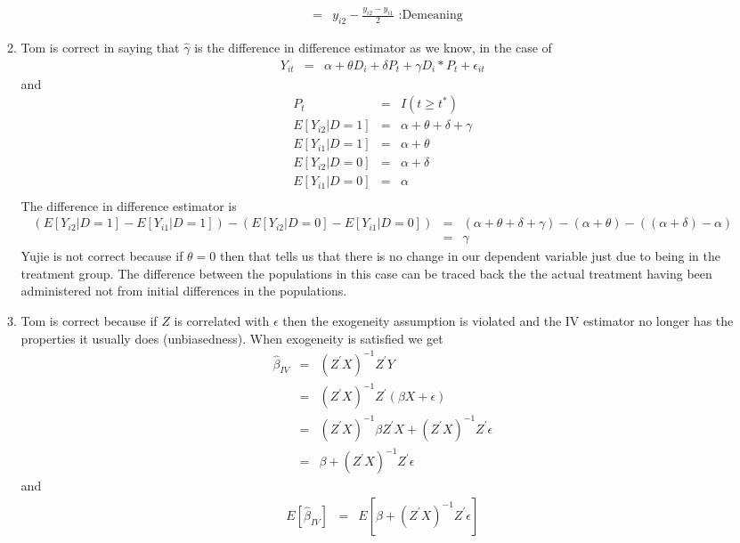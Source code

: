 \documentclass[11pt]{SelfArxOneColBMN}
\begin{document}
\begin{enumerate}
\begin{enumerate}
\begin{eqnarray*}
      &=& y_{i2} - \frac{y_{i2} - y_{i1}}{2}\text{ :Demeaning}
    \end{eqnarray*}
    \item Tom is correct in saying that $\hat{\gamma}$ is the difference in difference estimator as we know, in the case of
    \begin{eqnarray*}
      Y_{it} &=& \alpha + \theta D_i + \delta P_t + \gamma D_i * P_t + \epsilon_{it}
    \end{eqnarray*}
    and
    \begin{eqnarray*}
      P_t &=& I(t \geq t^*)\\
    E[Y_{i2}|D = 1] &=& \alpha + \theta + \delta + \gamma\\
    E[Y_{i1}|D = 1] &=& \alpha + \theta\\
    E[Y_{i2}|D = 0] &=& \alpha + \delta\\
    E[Y_{i1}|D = 0] &=& \alpha\\
    \end{eqnarray*}
    The difference in difference estimator is
    \begin{eqnarray*}
      (E[Y_{i2}|D = 1] - E[Y_{i1}|D = 1]) - (E[Y_{i2}|D = 0] - E[Y_{i1}|D = 0]) &=& (\alpha + \theta + \delta + \gamma) - (\alpha + \theta) - ((\alpha + \delta) - \alpha)\\
      &=& \gamma
    \end{eqnarray*}
    Yujie is not correct because if $\theta = 0$ then that tells us that there is no change in our dependent variable just due to being in the treatment group. The difference between the populations in this case can be traced back the the actual treatment having been administered not from initial differences in the populations.
    \item Tom is correct because if $Z$ is correlated with $\epsilon$ then the exogeneity assumption is violated and the IV estimator no longer has the properties it usually does (unbiasedness). When exogeneity is satisfied we get
    \begin{eqnarray*}
      \hat{\beta}_{IV} &=& (Z^\prime X)^{-1}Z^\prime Y\\
      &=& (Z^\prime X)^{-1}Z^\prime(\beta X + \epsilon)\\
      &=& (Z^\prime X)^{-1}\beta Z^\prime X + (Z^\prime X)^{-1}Z^\prime\epsilon\\
      &=& \beta + (Z^\prime X)^{-1}Z^\prime\epsilon
    \end{eqnarray*}
    and
    \begin{eqnarray*}
      E[\hat{\beta}_{IV}] &=& E[\beta + (Z^\prime X)^{-1}Z^\prime\epsilon]\\

\end{eqnarray*}
\end{enumerate}
\end{enumerate}
\end{document}
